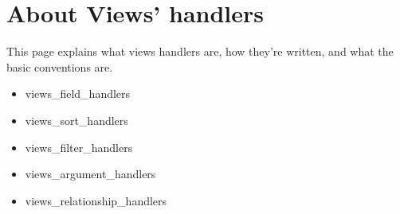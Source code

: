 \section{About Views' handlers}\label{views_handlers}
This page explains what views handlers are, how they're written, and what the basic conventions are.

\begin{itemize}
\item views\_\-field\_\-handlers\item views\_\-sort\_\-handlers\item views\_\-filter\_\-handlers\item views\_\-argument\_\-handlers\item views\_\-relationship\_\-handlers \end{itemize}
